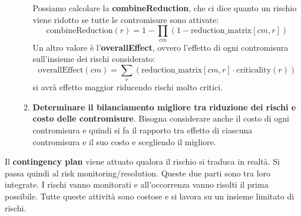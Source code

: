 \begin{enumerate}
\begin{enumerate}
                    Possiamo calcolare la \textbf{combineReduction}, che ci dice
                    quanto un rischio viene ridotto se tutte le contromisure sono
                    attivate:
                    \begin{equation}
                        \text{combineReduction}(r) = 1 - \prod_{cm}(1 -
                        \text{reduction\_matrix}[cm, r])
                    \end{equation}
                    Un altro valore è l'\textbf{overallEffect}, ovvero l'effetto
                    di ogni contromisura sull'insieme dei rischi considerato:
                    \begin{equation}
                        \text{overallEffect}(cm) = \sum_{r} (\text{reduction\_matrix}[cm, r]
                        \cdot \text{criticality}(r))
                    \end{equation}
                    si avrà effetto maggior riducendo rischi molto critici.
              \item \textbf{Determinare il bilanciamento migliore tra riduzione
                        dei rischi e costo delle contromisure}.
                    Bisogna considerare anche il costo di ogni contromisura e
                    quindi si fa il rapporto tra effetto di ciascuna contromisura
                    e il suo costo e scegliendo il migliore.
          \end{enumerate}
\end{enumerate}
Il \textbf{contingency plan} viene attuato qualora il rischio si traduca in realtà.
Si passa quindi al risk monitoring/resolution. Queste due parti sono tra loro
integrate. I rischi vanno monitorati e all'occorrenza vanno risolti il prima
possibile. Tutte queste attività sono costose e si lavora su un insieme limitato
di rischi.